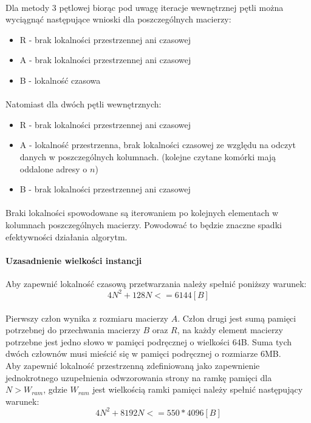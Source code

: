 \documentclass{scrartcl}
\begin{document}
\paragraph{}
Dla metody 3 pętlowej biorąc pod uwagę iteracje wewnętrznej pętli można wyciągnąć następujące wnioski dla poszczególnych macierzy: \\
\begin{itemize}
\item R - brak lokalności przestrzennej ani czasowej
\item A - brak lokalności przestrzennej ani czasowej
\item B - lokalność czasowa
\end{itemize}
\paragraph{}Natomiast dla dwóch pętli wewnętrznych:
\begin{itemize}
\item R - brak lokalności przestrzennej ani czasowej
\item A - lokalność przestrzenna, brak lokalności czasowej ze względu na odczyt danych w poszczególnych kolumnach. (kolejne czytane komórki mają oddalone adresy o $n$)
\item B - brak lokalności przestrzennej ani czasowej
\end{itemize}
\paragraph{}Braki lokalności spowodowane są iterowaniem po kolejnych elementach w kolumnach poszczególnych macierzy. Powodować to będzie znaczne spadki efektywności działania algorytm.
\paragraph{Uzasadnienie wielkości instancji} Aby zapewnić lokalność czasową przetwarzania należy spełnić poniższy warunek:
\begin{equation}
4N ^ 2 + 128N <= 6144 [B]
\end{equation}
\paragraph{}Pierwszy człon wynika z rozmiaru macierzy $A$. Człon drugi jest sumą pamięci potrzebnej do przechwania macierzy $B$ oraz $R$, na każdy element macierzy potrzebne jest jedno słowo w pamięci podręcznej o wielkości 64B. Suma tych dwóch człownów musi mieścić się w pamięci podręcznej o rozmiarze 6MB. \\
Aby zapewnić lokalność przestrzenną zdefiniowaną jako zapewnienie jednokrotnego uzupełnienia odwzorowania strony na ramkę pamięci dla $N > W_{ram}$, gdzie $W_{ram}$ jest wielkością ramki pamięci należy spełnić następujący warunek:
\begin{equation}
4N ^ 2 + 8192 N <= 550 * 4096 [B]
\end{equation}
\end{document}
